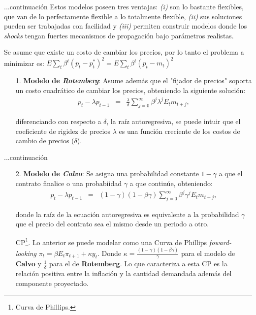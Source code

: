 \documentclass{beamer}
\begin{document}
\begin{frame}{...continuaci\'on}
Estos modelos poseen tres ventajas: \emph{(i)} son lo bastante flexibles, que van de lo perfectamente flexible a lo totalmente flexible, \emph{(ii)} sus soluciones pueden ser trabajadas con facilidad y \emph{(iii)} permiten construir modelos donde los \emph{shocks} tengan fuertes mecanismos de propagaci\'on bajo par\'ametros realistas.

\smallskip
Se asume que existe un costo de cambiar los precios, por lo tanto el problema a minimizar es: $E\sum_{t}\beta^{t}(p_{t}-p_{t}^{*})^{2}=E\sum_{t}\beta^{t}(p_{t}-m_{t})^{2}$

\begin{enumerate}
\item[1.]{\textbf{Modelo de \emph{Rotemberg}}: Asume adem\'as que el "fijador de precios" soporta un costo cuadr\'atico de cambiar los precios, obteniendo la siguiente soluci\'on:}
\begin{eqnarray*}
p_{t}-\lambda p_{t-1} & = & \frac{\lambda}{\delta}\sum_{j=0}^{\infty}\beta^{j}\lambda^{j}E_{t}m_{t+j},
\end{eqnarray*}

diferenciando con respecto a $\delta$, la ra\'iz autoregresiva, se puede intuir que el coeficiente de rigidez de precios $\lambda$ es una funci\'on creciente de los costos de cambio de precios ($\delta$).
\end{enumerate}
\end{frame}


\begin{frame}{...continuaci\'on}

\begin{enumerate}
\item[2.]{\textbf{Modelo de \emph{Calvo}}: Se asigna una probabilidad constante $1-\gamma$ a que el contrato finalice o una probabiidad $\gamma$ a que contin\'ue, obteniendo:}
\begin{eqnarray*}
p_{t}-\lambda p_{t-1} & = & (1-\gamma)(1-\beta\gamma)\sum_{j=0}^{\infty}\beta^{j}\gamma^{j}E_{t}m_{t+j},
\end{eqnarray*}

donde la ra\'iz de la ecuaci\'on autoregresiva es equivalente a la probabilidad $\gamma$ que el precio del contrato sea el mismo desde un periodo a otro.
\item[CP\footnote{Curva de Phillips.}.]{Lo anterior se puede modelar como una Curva de Phillips \emph{foward-looking} $\pi_{t}=\beta E_{t}\pi_{t+1}+\kappa y_{t}$. Donde $\kappa=\frac{(1-\gamma)(1-\beta\gamma)}{\gamma}$ para el modelo de \textbf{Calvo} y $\frac{1}{\delta}$ para el de \textbf{Rotemberg}. Lo que caracteriza a esta CP es la relaci\'on positiva entre la inflaci\'on y la cantidad demandada adem\'as del componente proyectado.}
\end{enumerate}
\end{frame}
\end{document}
